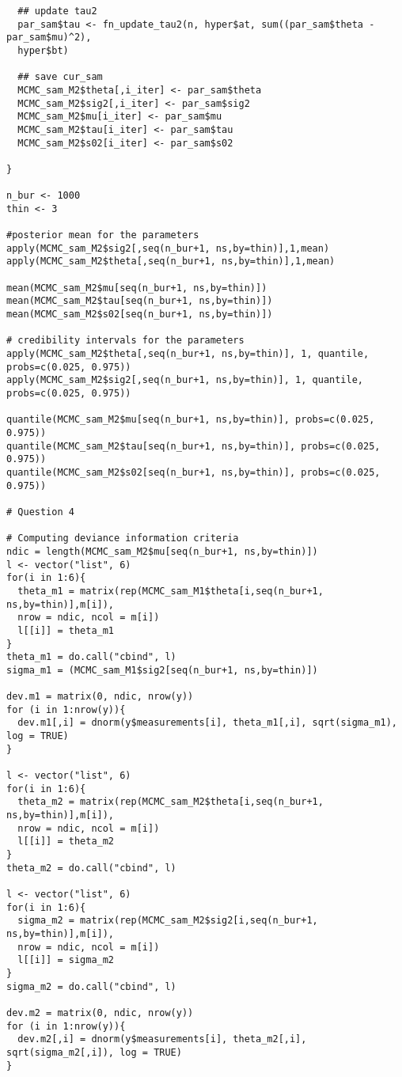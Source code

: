\documentclass[a4paper, 11pt]{article}
\begin{document}
\begin{verbatim}
  ## update tau2
  par_sam$tau <- fn_update_tau2(n, hyper$at, sum((par_sam$theta - par_sam$mu)^2), 
  hyper$bt)
  
  ## save cur_sam
  MCMC_sam_M2$theta[,i_iter] <- par_sam$theta
  MCMC_sam_M2$sig2[,i_iter] <- par_sam$sig2
  MCMC_sam_M2$mu[i_iter] <- par_sam$mu
  MCMC_sam_M2$tau[i_iter] <- par_sam$tau
  MCMC_sam_M2$s02[i_iter] <- par_sam$s02
  
}

n_bur <- 1000
thin <- 3

#posterior mean for the parameters
apply(MCMC_sam_M2$sig2[,seq(n_bur+1, ns,by=thin)],1,mean)
apply(MCMC_sam_M2$theta[,seq(n_bur+1, ns,by=thin)],1,mean)

mean(MCMC_sam_M2$mu[seq(n_bur+1, ns,by=thin)])
mean(MCMC_sam_M2$tau[seq(n_bur+1, ns,by=thin)])
mean(MCMC_sam_M2$s02[seq(n_bur+1, ns,by=thin)])

# credibility intervals for the parameters
apply(MCMC_sam_M2$theta[,seq(n_bur+1, ns,by=thin)], 1, quantile,  probs=c(0.025, 0.975))
apply(MCMC_sam_M2$sig2[,seq(n_bur+1, ns,by=thin)], 1, quantile,  probs=c(0.025, 0.975))

quantile(MCMC_sam_M2$mu[seq(n_bur+1, ns,by=thin)], probs=c(0.025, 0.975))
quantile(MCMC_sam_M2$tau[seq(n_bur+1, ns,by=thin)], probs=c(0.025, 0.975))
quantile(MCMC_sam_M2$s02[seq(n_bur+1, ns,by=thin)], probs=c(0.025, 0.975))

# Question 4

# Computing deviance information criteria
ndic = length(MCMC_sam_M2$mu[seq(n_bur+1, ns,by=thin)])
l <- vector("list", 6)
for(i in 1:6){
  theta_m1 = matrix(rep(MCMC_sam_M1$theta[i,seq(n_bur+1, ns,by=thin)],m[i]), 
  nrow = ndic, ncol = m[i])
  l[[i]] = theta_m1 
}
theta_m1 = do.call("cbind", l)
sigma_m1 = (MCMC_sam_M1$sig2[seq(n_bur+1, ns,by=thin)])

dev.m1 = matrix(0, ndic, nrow(y))
for (i in 1:nrow(y)){
  dev.m1[,i] = dnorm(y$measurements[i], theta_m1[,i], sqrt(sigma_m1), log = TRUE)
}

l <- vector("list", 6)
for(i in 1:6){
  theta_m2 = matrix(rep(MCMC_sam_M2$theta[i,seq(n_bur+1, ns,by=thin)],m[i]), 
  nrow = ndic, ncol = m[i])
  l[[i]] = theta_m2
}
theta_m2 = do.call("cbind", l)

l <- vector("list", 6)
for(i in 1:6){
  sigma_m2 = matrix(rep(MCMC_sam_M2$sig2[i,seq(n_bur+1, ns,by=thin)],m[i]), 
  nrow = ndic, ncol = m[i])
  l[[i]] = sigma_m2 
}
sigma_m2 = do.call("cbind", l)

dev.m2 = matrix(0, ndic, nrow(y))
for (i in 1:nrow(y)){
  dev.m2[,i] = dnorm(y$measurements[i], theta_m2[,i], sqrt(sigma_m2[,i]), log = TRUE)
}


\end{verbatim}
\end{document}
